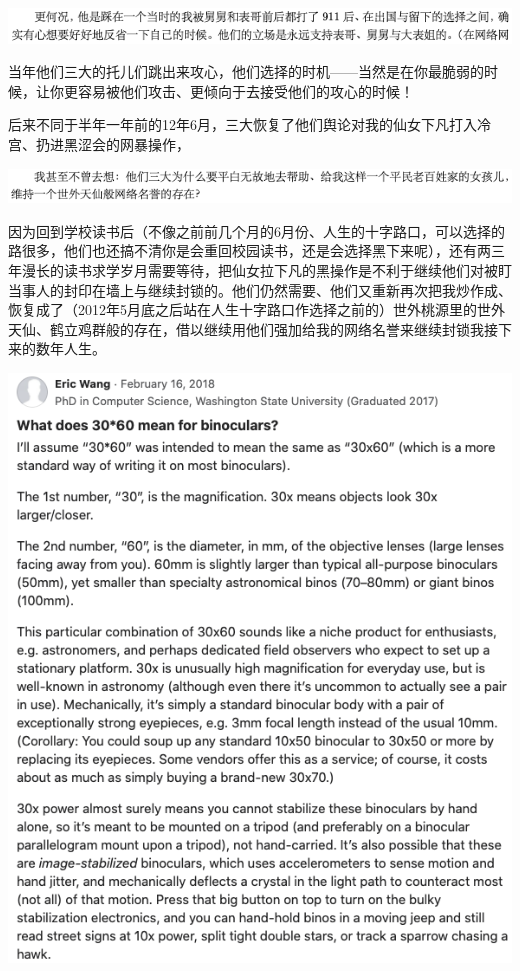 \documentclass[9pt, b5paper]{article}
\begin{document}
\begin{center}
\includegraphics[width=.9\linewidth]{./pic/backups_plans_20210424_095855.png}
\end{center}

当年他们三大的托儿们跳出来攻心，他们选择的时机——当然是在你最脆弱的时候，让你更容易被他们攻击、更倾向于去接受他们的攻心的时候！

后来不同于半年一年前的12年6月，三大恢复了他们舆论对我的仙女下凡打入冷宫、扔进黑涩会的网暴操作，

\begin{center}
\includegraphics[width=.9\linewidth]{./pic/backups_plans_20210424_100340.png}
\end{center}

因为回到学校读书后（不像之前前几个月的6月份、人生的十字路口，可以选择的路很多，他们也还搞不清你是会重回校园读书，还是会选择黑下来呢），还有两三年漫长的读书求学岁月需要等待，把仙女拉下凡的黑操作是不利于继续他们对被盯当事人的封印在墙上与继续封锁的。他们仍然需要、他们又重新再次把我炒作成、恢复成了（2012年5月底之后站在人生十字路口作选择之前的）世外桃源里的世外天仙、鹤立鸡群般的存在，借以继续用他们强加给我的网络名誉来继续封锁我接下来的数年人生。 

\begin{center}
\includegraphics[width=.9\linewidth]{./pic/readme_20210429_202505.png}
\end{center}
\end{document}
